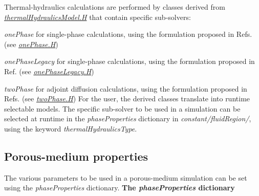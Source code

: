 Thermal-\/hydraulics calculations are performed by classes derived from {\itshape \hyperlink{thermalHydraulicsModel_8H}{thermal\+Hydraulics\+Model.\+H}} that contain specific sub-\/solvers\+:
\begin{DoxyItemize}
\item {\itshape one\+Phase} for single-\/phase calculations, using the formulation proposed in Refs. \cite{Radman2019ADesign} \cite{RADMAN2021111178} \cite{RADMAN2021111422} (see {\itshape \hyperlink{onePhase_8H}{one\+Phase.\+H}})
\item {\itshape one\+Phase\+Legacy} for single-\/phase calculations, using the formulation proposed in Ref. \cite{FIORINA201524} (see {\itshape \hyperlink{onePhaseLegacy_8H}{one\+Phase\+Legacy.\+H}})
\item {\itshape two\+Phase} for adjoint diffusion calculations, using the formulation proposed in Refs. \cite{Radman2019ADesign} \cite{RADMAN2021111178} \cite{RADMAN2021111422} (see {\itshape \hyperlink{twoPhase_8H}{two\+Phase.\+H}}) For the user, the derived classes translate into runtime selectable models. The specific sub-\/solver to be used in a simulation can be selected at runtime in the {\itshape phase\+Properties} dictionary in {\itshape constant/fluid\+Region/}, using the keyword {\itshape thermal\+Hydraulics\+Type}.
\end{DoxyItemize}

\subsection*{Porous-\/medium properties}

The various parameters to be used in a porous-\/medium simulation can be set using the {\itshape phase\+Properties} dictionary.  {\bfseries The {\itshape phase\+Properties} dictionary}

